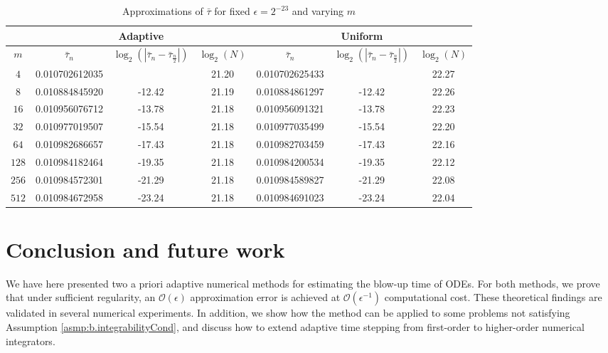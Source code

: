 \documentclass[a4paper, oneside, reqno]{amsart}
\newcommand{\abs}[1]{\left\lvert#1\right\rvert}
\theoremstyle{remark}
\begin{document}
\begin{table}
  \scriptsize
  \center
  \begin{tabular}{c | c c c | c c c}
    \hline
          & \multicolumn{3}{c}{Adaptive} & \multicolumn{3}{c}{Uniform} \\
    \hline
    \(m\) & \(\bar\tau_n\) & \(\log_2\left(\abs{\bar\tau_{n}-\bar\tau_{\frac{n}{2}}}\right)\) & \(\log_{2}(N)\) & \(\bar\tau_n\) & \(\log_2\left(\abs{\bar\tau_{n}-\bar\tau_{\frac{n}{2}}}\right)\) & \(\log_{2}(N)\) \\
    \hline
    \(4\)   & 0.010702612035 &        & 21.20 & 0.010702625433 &        & 22.27 \\
    \(8\)   & 0.010884845920 & -12.42 & 21.19 & 0.010884861297 & -12.42 & 22.26 \\
    \(16\)  & 0.010956076712 & -13.78 & 21.18 & 0.010956091321 & -13.78 & 22.23 \\
    \(32\)  & 0.010977019507 & -15.54 & 21.18 & 0.010977035499 & -15.54 & 22.20 \\
    \(64\)  & 0.010982686657 & -17.43 & 21.18 & 0.010982703459 & -17.43 & 22.16 \\
    \(128\) & 0.010984182464 & -19.35 & 21.18 & 0.010984200534 & -19.35 & 22.12 \\
    \(256\) & 0.010984572301 & -21.29 & 21.18 & 0.010984589827 & -21.29 & 22.08 \\
    \(512\) & 0.010984672958 & -23.24 & 21.18 & 0.010984691023 & -23.24 & 22.04 \\
    \hline    
  \end{tabular}
  \caption{Approximations of \(\bar\tau\) for fixed \(\epsilon = 2^{-23}\) and varying \(m\)}
  \label{tab:resultsFixedEpsVaryN}
\end{table}

\section{Conclusion and future work}
We have here presented two a priori adaptive numerical methods for estimating the blow-up time of ODEs. 
For both methods, we prove that under sufficient regularity, 
an $\mathcal{O}(\epsilon)$ approximation error 
is achieved at $\mathcal{O}(\epsilon^{-1})$ computational cost.
These theoretical findings are validated in several numerical experiments.
In addition, we show how the method can be applied to some problems not satisfying Assumption \ref{asmp:b.integrabilityCond}, and discuss how to extend adaptive time stepping from first-order 
to higher-order numerical integrators. 
\end{document}
